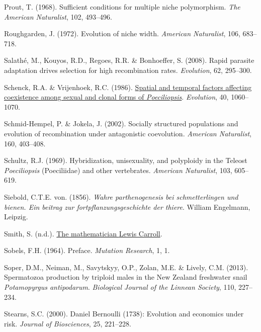 \documentclass[
  american,
  letterpaper,
]{book}
\newlength{\cslhangindent}
\newenvironment{CSLReferences}[2] %
 {\begin{list}{}{%
  \setlength{\itemindent}{0pt}
  \setlength{\leftmargin}{0pt}
  \setlength{\parsep}{0pt}
  \ifodd #1
   \setlength{\leftmargin}{\cslhangindent}
   \setlength{\itemindent}{-1\cslhangindent}
  \fi
  \setlength{\itemsep}{#2\baselineskip}}}
 {\end{list}}
\begin{document}
\begin{CSLReferences}{1}{0}
Prout, T. (1968). Sufficient conditions for multiple niche polymorphism.
\emph{The American Naturalist}, 102, 493--496.

Roughgarden, J. (1972). Evolution of niche width. \emph{American
Naturalist}, 106, 683--718.

Salathé, M., Kouyos, R.D., Regoes, R.R. \& Bonhoeffer, S. (2008). Rapid
parasite adaptation drives selection for high recombination rates.
\emph{Evolution}, 62, 295--300.

Schenck, R.A. \& Vrijenhoek, R.C. (1986).
\href{https://doi.org/10.1111/j.1558-5646.1986.tb00573.x}{Spatial and
temporal factors affecting coexistence among sexual and clonal forms of
\emph{{P}oeciliopsis}}. \emph{Evolution}, 40, 1060--1070.

Schmid-Hempel, P. \& Jokela, J. (2002). Socially structured populations
and evolution of recombination under antagonistic coevolution.
\emph{American Naturalist}, 160, 403--408.

Schultz, R.J. (1969). Hybridization, unisexuality, and polyploidy in the
{Teleost} \emph{{P}oeciliopsis} ({Poeciliidae}) and other vertebrates.
\emph{American Naturalist}, 103, 605--619.

Siebold, C.T.E. von. (1856). \emph{Wahre parthenogenesis bei
schmetterlingen und bienen. Ein beitrag zur fortpflanzungsgeschichte der
thiere}. William Engelmann, Leipzig.

Smith, S. (n.d.).
\href{http://www.herkimershideaway.org/writings/carroll.htm}{The
mathematician {Lewis Carroll}}.

Sobels, F.H. (1964). Preface. \emph{Mutation Research}, 1, 1.

Soper, D.M., Neiman, M., Savytskyy, O.P., Zolan, M.E. \& Lively, C.M.
(2013). Spermatozoa production by triploid males in the {New Zealand}
freshwater snail \emph{{P}otamopyrgus antipodarum}. \emph{Biological
Journal of the Linnean Society}, 110, 227--234.

Stearns, S.C. (2000). {Daniel Bernoulli} (1738): Evolution and economics
under risk. \emph{Journal of Biosciences}, 25, 221--228.


\end{CSLReferences}
\end{document}
